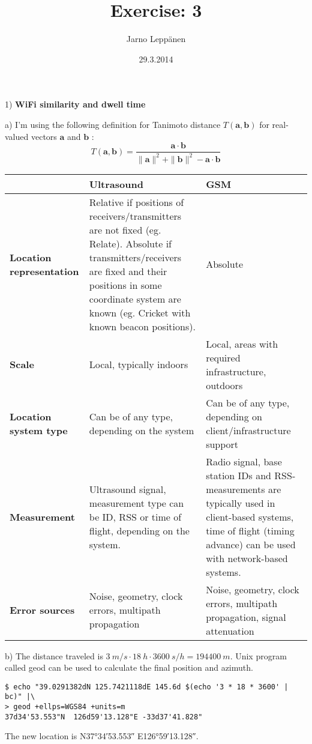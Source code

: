 \documentclass[a4paper,parskip=full]{scrartcl}
\author{Jarno Leppänen}
\title{Exercise: 3}
\date{29.3.2014}
\renewcommand{\vec}[1]{\mathbf{#1}}
\begin{document}
\maketitle

1) \textbf{WiFi similarity and dwell time}

  a) I'm using the following definition for Tanimoto distance
  $T(\vec{a}, \vec{b})$ for real-valued vectors $\vec{a}$ and $\vec{b}$
  \cite{chon2012automatically}:
  \begin{equation*}
    T(\vec{a}, \vec{b}) = \frac{\vec{a} \cdot \vec{b}}
        {\|\vec{a}\|^2 + \|\vec{b}\|^2 - \vec{a} \cdot \vec{b}}
  \end{equation*}

\begin{tabularx}{\textwidth}{ | >{\raggedright\arraybackslash}p{14ex} | >{\raggedright\arraybackslash}X | >{\raggedright\arraybackslash}X | }
  \hline
  & \textbf{Ultrasound} & \textbf{GSM} \\ \hline
  \textbf{Location representation} &
    Relative if positions of receivers/transmitters are not fixed (eg.
    Relate). Absolute if transmitters/receivers are fixed and their positions in
    some coordinate system are known (eg. Cricket with known beacon positions).
    &
    Absolute \\ \hline
  \textbf{Scale} & Local, typically indoors & Local, areas with required
    infrastructure, outdoors \\ \hline
  \textbf{Location system type} & Can be of any type, depending on the system
    & Can be of any type, depending on client/infrastructure support \\ \hline
  \textbf{Measurement} & Ultrasound signal, measurement type can be
    ID, RSS or time of flight, depending on the system. & Radio signal,
      base station IDs and RSS-measurements are typically used in
      client-based systems, time of flight (timing advance) can be used with
      network-based systems. \\ \hline
  \textbf{Error sources} & Noise, geometry, clock errors, multipath propagation
    & Noise, geometry, clock errors, multipath propagation, signal
      attenuation \\ \hline
\end{tabularx}

b) The distance traveled is $\SI{3}{m/s} \cdot \SI{18}{h} \cdot \SI{3600}{s/h}
= \SI{194400}{m}$. Unix program called geod can be used to calculate the
final position and azimuth.
\begin{verbatim}
$ echo "39.0291382dN 125.7421118dE 145.6d $(echo '3 * 18 * 3600' | bc)" |\
> geod +ellps=WGS84 +units=m
37d34'53.553"N  126d59'13.128"E -33d37'41.828"
\end{verbatim}
The new location is N\ang{37;34;53.553} E\ang{126;59;13.128}.
\end{document}
